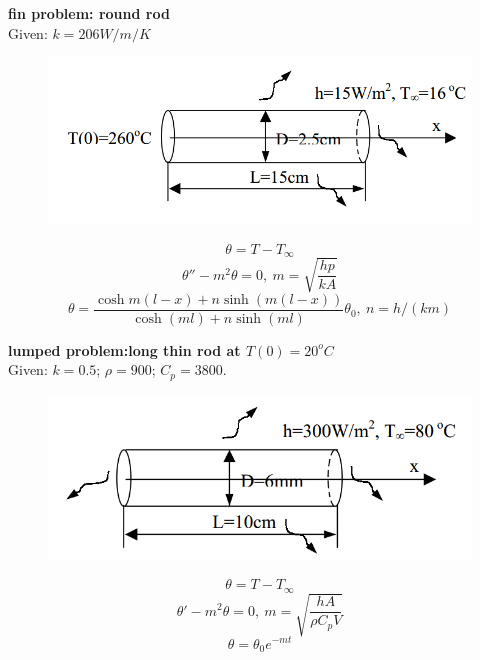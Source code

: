 \begin{example}
\textbf{fin problem: round rod}\\
Given: $k=206W/m/K$
\begin{figure}[H]
  \centering
    \includegraphics[scale=0.5]{figures/appendixA/3}
\end{figure}
$$\theta=T-T_\infty$$
$$\theta''-m^2\theta=0,~m=\sqrt{\frac{hp}{kA}}$$
$$\theta=\frac{\cosh{m(l-x)}+n\sinh{(m(l-x))}}{\cosh{(ml)}+n\sinh{(ml)}}\theta_0,~n=h/(km)$$
\end{example}

\begin{example}
\textbf{lumped problem:long thin rod at $T(0)=20^oC$}\\
Given: $k = 0.5$; $\rho= 900$; $C_p = 3800$.
\begin{figure}[H]
  \centering
    \includegraphics[scale=0.5]{figures/appendixA/4}
\end{figure}
$$\theta=T-T_\infty$$
$$\theta'-m^2\theta=0,~m=\sqrt{\frac{hA}{\rho C_pV}}$$
$$\theta=\theta_0e^{-mt}$$
\end{example}

